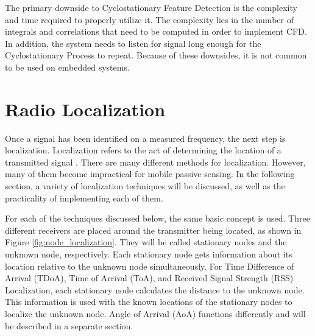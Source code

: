 




The primary downside to Cyclostationary Feature Detection is the complexity and time required to properly utilize it. The complexity lies in the number of integrals and correlations that need to be computed in order to implement CFD. In addition, the system needs to listen for signal long enough for the Cyclostationary Process to repeat. Because of these downsides, it is not common to be used on embedded systems. \par


\section{Radio Localization} \label{back:radio_loc}
Once a signal has been identified on a measured frequency, the next step is localization. Localization refers to the act of determining the location of a transmitted signal \cite{local_conf}. There are many different methods for localization. However, many of them become impractical for mobile passive sensing. In the following section, a variety of localization techniques will be discussed, as well as the practicality of implementing each of them.\par
For each of the techniques discussed below, the same basic concept is used. Three different receivers are placed around the transmitter being located, as shown in Figure \ref{fig:node_localization}.  They will be called stationary nodes and the unknown node, respectively. Each stationary node gets information about its location relative to the unknown node simultaneously. For Time Difference of Arrival (TDoA), Time of Arrival (ToA), and Received Signal Strength (RSS) Localization, each stationary node calculates the distance to the unknown node. This information is used with the known locations of the stationary nodes to localize the unknown node. Angle of Arrival (AoA) functions differently and will be described in a separate section. \par

